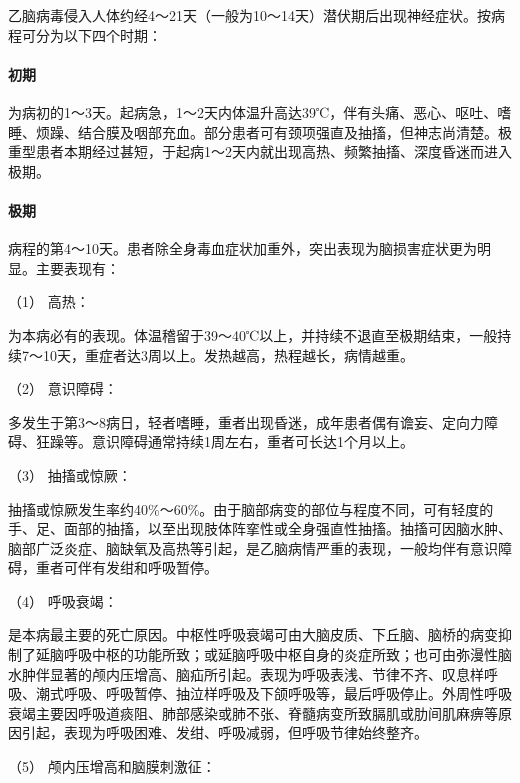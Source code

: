 乙脑病毒侵入人体约经4～21天（一般为10～14天）潜伏期后出现神经症状。按病程可分为以下四个时期：

\paragraph{初期}

为病初的1～3天。起病急，1～2天内体温升高达39℃，伴有头痛、恶心、呕吐、嗜睡、烦躁、结合膜及咽部充血。部分患者可有颈项强直及抽搐，但神志尚清楚。极重型患者本期经过甚短，于起病1～2天内就出现高热、频繁抽搐、深度昏迷而进入极期。

\paragraph{极期}

病程的第4～10天。患者除全身毒血症状加重外，突出表现为脑损害症状更为明显。主要表现有：

\hypertarget{text00219.htmlux5cux23CHP7-5-2-2-2-1}{}
（1） 高热：

为本病必有的表现。体温稽留于39～40℃以上，并持续不退直至极期结束，一般持续7～10天，重症者达3周以上。发热越高，热程越长，病情越重。

\hypertarget{text00219.htmlux5cux23CHP7-5-2-2-2-2}{}
（2） 意识障碍：

多发生于第3～8病日，轻者嗜睡，重者出现昏迷，成年患者偶有谵妄、定向力障碍、狂躁等。意识障碍通常持续1周左右，重者可长达1个月以上。

\hypertarget{text00219.htmlux5cux23CHP7-5-2-2-2-3}{}
（3） 抽搐或惊厥：

抽搐或惊厥发生率约40\%～60\%。由于脑部病变的部位与程度不同，可有轻度的手、足、面部的抽搐，以至出现肢体阵挛性或全身强直性抽搐。抽搐可因脑水肿、脑部广泛炎症、脑缺氧及高热等引起，是乙脑病情严重的表现，一般均伴有意识障碍，重者可伴有发绀和呼吸暂停。

\hypertarget{text00219.htmlux5cux23CHP7-5-2-2-2-4}{}
（4） 呼吸衰竭：

是本病最主要的死亡原因。中枢性呼吸衰竭可由大脑皮质、下丘脑、脑桥的病变抑制了延脑呼吸中枢的功能所致；或延脑呼吸中枢自身的炎症所致；也可由弥漫性脑水肿伴显著的颅内压增高、脑疝所引起。表现为呼吸表浅、节律不齐、叹息样呼吸、潮式呼吸、呼吸暂停、抽泣样呼吸及下颌呼吸等，最后呼吸停止。外周性呼吸衰竭主要因呼吸道痰阻、肺部感染或肺不张、脊髓病变所致膈肌或肋间肌麻痹等原因引起，表现为呼吸困难、发绀、呼吸减弱，但呼吸节律始终整齐。

\hypertarget{text00219.htmlux5cux23CHP7-5-2-2-2-5}{}
（5） 颅内压增高和脑膜刺激征：

